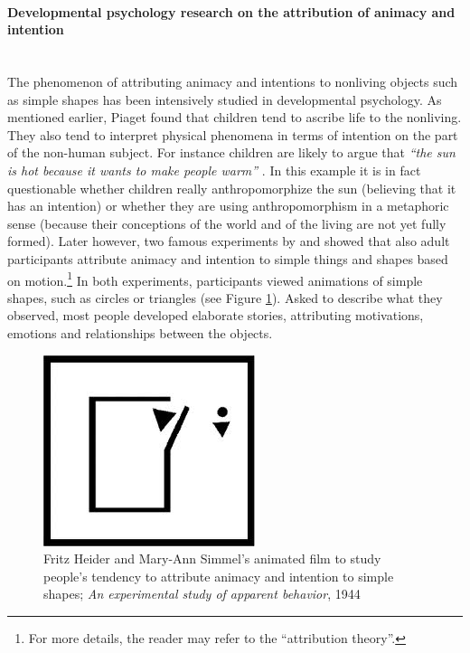 \documentclass{frontiersSCNS} %
\begin{document}
\paragraph*{Developmental psychology research on the attribution of animacy and intention\\ \\}

The phenomenon of attributing animacy and intentions to nonliving objects such as simple shapes has been intensively studied in developmental psychology. As mentioned earlier, Piaget found that children tend to ascribe life to the nonliving. They also tend to interpret physical phenomena in terms of intention on the part of the non-human subject. For instance children are likely to argue that \textit{``the sun is hot because it wants to make people warm''} \citep{leeds_childrens_1992}. In this example it is in fact questionable whether children really anthropomorphize the sun (believing that it has an intention) or whether they are using anthropomorphism in a metaphoric sense (because their conceptions of the world and of the living are not yet fully formed). Later however, two famous experiments by \cite{heider_experimental_1944} and \cite{michotte_perception_1963} showed that also adult participants attribute animacy and intention to simple things and shapes based on motion.\footnote{For more details, the reader may refer to the ``attribution theory''.} In both experiments, participants viewed animations of simple shapes, such as circles or triangles (see Figure \ref{fig:animacy_attribution}). Asked to describe what they observed, most people developed elaborate stories, attributing motivations, emotions and relationships between the objects.

\begin{figure}[h]\centering
  \includegraphics[scale=0.6]{heider-simmel_animation.jpeg}
 \caption{Fritz Heider and Mary-Ann Simmel's animated film to study people's tendency to attribute animacy and intention to simple shapes; \textit{An experimental study of apparent behavior}, 1944}
 \label{fig:animacy_attribution}       %
 \end{figure}
\end{document}
